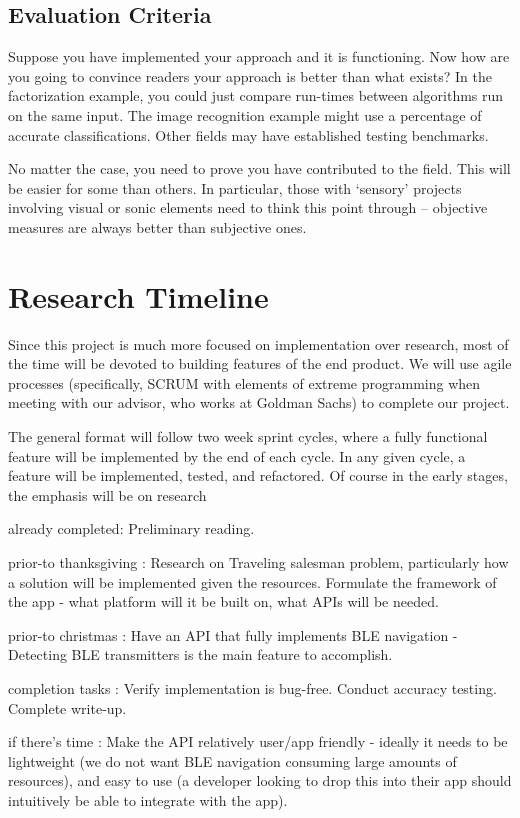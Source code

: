 \documentclass{sig-alternate}
\begin{document}
\subsection{Evaluation Criteria}
\label{subsec:eval_criteria}
Suppose you have implemented your approach and it is functioning. Now
how are you going to convince readers your approach is better than
what exists? In the factorization example, you could just compare
run-times between algorithms run on the same input. The image
recognition example might use a percentage of accurate
classifications. Other fields may have established testing benchmarks.

No matter the case, you need to prove you have contributed to the
field. This will be easier for some than others. In particular, those
with `sensory' projects involving visual or sonic elements need to
think this point through -- objective measures are always better than
subjective ones.

\section{Research Timeline}
\label{sec:research_timeline}
Since this project is much more focused on implementation over
research, most of the time will be devoted to building features of 
the end product. We will use agile processes (specifically, SCRUM 
with elements of extreme programming when meeting with our 
advisor, who works at Goldman Sachs) to complete our project.

The general format will follow two week sprint cycles, where a fully 
functional feature will be implemented by the end of each cycle. In
any given cycle, a feature will be implemented, tested, and refactored. 
Of course in the early stages, the emphasis will be on research
\begin{itemize*}
	\item {\sc already completed}: Preliminary reading. \vspace{3pt}
	\item {\sc prior-to thanksgiving} : Research on Traveling salesman problem, particularly how a solution will be implemented given the resources. Formulate the framework of the app - what platform will it be built on, what APIs will be needed.\vspace{3pt}
	\item {\sc prior-to christmas} : Have an API that fully implements BLE navigation - Detecting BLE transmitters is the main feature to accomplish.\vspace{3pt}
	\item {\sc completion tasks} : Verify implementation is bug-free. Conduct accuracy testing. Complete write-up.\vspace{3pt}
	\item {\sc if there's time} : Make the API relatively user/app friendly - ideally it needs to be
lightweight (we do not want BLE navigation consuming large amounts of resources), and easy to use (a developer looking to drop this into their app should intuitively be able to integrate with the app).
\end{itemize*}
\end{document}
